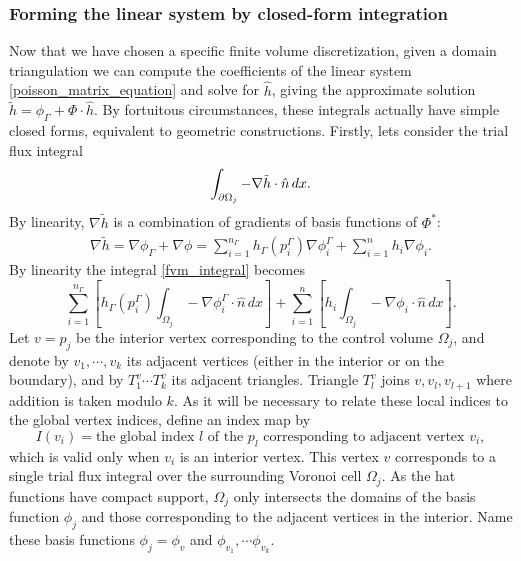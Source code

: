 \subsubsection{Forming the linear system by closed-form integration}
Now that we have chosen a specific finite volume discretization, given a domain triangulation we can compute
the coefficients of the linear system \eqref{poisson_matrix_equation} and solve for $\hat{h}$, giving
the approximate solution $\tilde{h} = \phi_\Gamma + \Phi\cdot \hat{h}$.
By fortuitous circumstances, these integrals actually have simple closed forms, equivalent to geometric constructions.
Firstly, lets consider the trial flux integral
\begin{equation}\label{fvm_integral}
\int_{{\partial\Omega}_j} -\nabla \tilde{h}\cdot\hat{n}\,dx.
\end{equation}
By linearity, $\nabla \tilde{h}$ is a combination of gradients of basis functions of $\Phi^*$:
\begin{align*}
    \nabla \tilde{h} = \nabla\phi_\Gamma + \nabla\phi
             = \sum_{i=1}^{n_\Gamma}h_\Gamma(p^\Gamma_i)\nabla\phi^\Gamma_i + \sum_{i=1}^n h_i\nabla\phi_i.
\end{align*}
By linearity the integral \eqref{fvm_integral} becomes
\begin{equation}\label{fvm_integral_linearity_expanded}
    \sum_{i=1}^{n_\Gamma}\left[h_\Gamma(p^\Gamma_i)\int_{\Omega_j}-\nabla\phi^\Gamma_i\cdot\hat{n}\,dx\right]
    + \sum_{i=1}^n\left[h_i\int_{\Omega_j}-\nabla\phi_i\cdot\hat{n}\,dx\right].
\end{equation}
Let $v = p_j$ be the interior vertex corresponding to the control volume $\Omega_j$, and denote by $v_1, \cdots, v_k$ its adjacent vertices (either in the interior
or on the boundary), and by $T^v_1 \cdots T^v_k$ its adjacent triangles. Triangle $T^v_l$ joins $v,v_l,v_{l+1}$ where addition is taken
modulo $k$. As it will be necessary to relate these local indices to the global vertex indices, define an index map by
    $$I(v_i) = \text{the global index $l$ of the $p_l$ corresponding to adjacent vertex $v_i$},$$
which is valid only when $v_i$ is an interior vertex.
This vertex $v$ corresponds to a single trial flux integral over the surrounding Voronoi cell $\Omega_j$.
As the hat functions have compact support, $\Omega_j$ only intersects the domains of the basis function $\phi_j$ and those corresponding
to the adjacent vertices in the interior. Name these basis functions $\phi_j = \phi_v$ and $\phi_{v_1}, \cdots \phi_{v_k}$.

